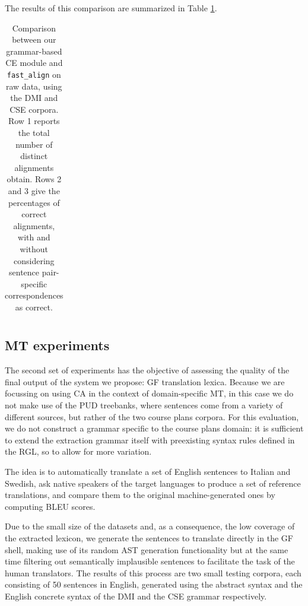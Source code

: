 \documentclass[11pt]{article}
\begin{document}
The results of this comparison are summarized in Table \ref{raw_fast}.

\begin{table}[h]
  \centering
  \small
  \begin{tabular}{l|lll}

  \end{tabular}
  \caption[Comparison between our grammar-based CE module and \texttt{fast\_align}]{Comparison between our grammar-based CE module and \texttt{fast\_align} on raw data, using the DMI and CSE corpora. Row 1 reports the total number of distinct alignments obtain. Rows 2 and 3 give the percentages of correct alignments, with and without considering sentence pair-specific correspondences as correct.}
  \label{raw_fast}
 \end{table}




\subsection{MT experiments}
The second set of experiments has the objective of assessing the quality of the final output of the system we propose: GF translation lexica. 
Because we are focussing on using CA in the context of domain-specific MT, in this case we do not make use of the PUD treebanks, where sentences come from a variety of different sources, but rather of the two course plans corpora. 
For this evaluation, we do not construct a grammar specific to the course plans domain: it is sufficient to extend the extraction grammar itself with preexisting syntax rules defined in the RGL, so to allow for more variation. 

The idea is to automatically translate a set of English sentences to Italian and Swedish, ask native speakers of the target languages to produce a set of reference translations, and compare them to the original machine-generated ones by computing BLEU scores.

Due to the small size of the datasets and, as a consequence, the low coverage of the extracted lexicon, we generate the sentences to translate directly in the GF shell, making use of its random AST generation functionality but at the same time filtering out semantically implausible sentences to facilitate the task of the human translators.
The results of this process are two small testing corpora, each consisting of 50 sentences in English, generated using the abstract syntax and the English concrete syntax of the DMI and the CSE grammar respectively. 
\end{document}
